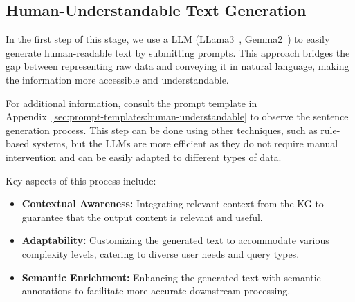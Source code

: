 \subsection{Human-Understandable Text Generation}\label{subsec:human-understandable-text-generation}
In the first step of this stage, we use a LLM (\eg LLama3~\cite{dubey2024llama3herdmodels}, Gemma2~\cite{gemmateam2024gemma2improvingopen}) to easily generate human-readable text by submitting prompts.
This approach bridges the gap between representing raw data and conveying it in natural language, making the information more accessible and understandable.

For additional information, consult the prompt template in Appendix~\ref{sec:prompt-templates:human-understandable} to observe the sentence generation process.
This step can be done using other techniques, such as rule-based systems, but the \acp{LLM} are more efficient as they do not require manual intervention and can be easily adapted to different types of data.

Key aspects of this process include:
\begin{itemize}
    \item \textbf{Contextual Awareness:} Integrating relevant context from the \ac{KG} to guarantee that the output content is relevant and useful.
    \item \textbf{Adaptability:} Customizing the generated text to accommodate various complexity levels, catering to diverse user needs and query types.
    \item \textbf{Semantic Enrichment:} Enhancing the generated text with semantic annotations to facilitate more accurate downstream processing.
\end{itemize}

